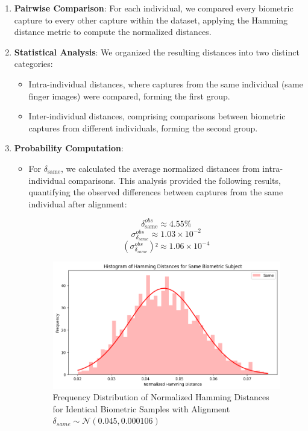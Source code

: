 \begin{enumerate}
    \item \textbf{Pairwise Comparison}: For each individual, we compared every biometric capture to every other capture within the dataset, applying the Hamming distance metric to compute the normalized distances.
    \item \textbf{Statistical Analysis}: We organized the resulting distances into two distinct categories:
    \begin{itemize}
        \item Intra-individual distances, where captures from the same individual (same finger images) were compared, forming the first group.
        \item Inter-individual distances, comprising comparisons between biometric captures from different individuals, forming the second group.
    \end{itemize}
    \newpage
    \item \textbf{Probability Computation}:
    \begin{itemize}
        \item For \( \delta_{\text{same}} \), we calculated the average normalized distances from intra-individual comparisons. This analysis provided the following results, quantifying the observed differences between captures from the same individual after alignment:

        \[ \delta_{\text{same}}^{obs} \approx 4.55\% \]
        \[ \sigma^{obs}_{\delta_{same}} \approx 1.03 \times 10^{-2} \]
        \[ (\sigma^{obs}_{\delta_{same}})² \approx 1.06 \times 10^{-4} \]

        \begin{figure}[H]
            \centering
            \includegraphics[width=0.7\linewidth]{latex-img/delta_same.png}
            \caption{Frequency Distribution of Normalized Hamming Distances for Identical Biometric Samples with Alignment \(\delta_{same} \sim \mathcal{N}(0.045, 0.000106)\)}
            \label{delta_same}
        \end{figure}
        

\end{itemize}
\end{enumerate}
